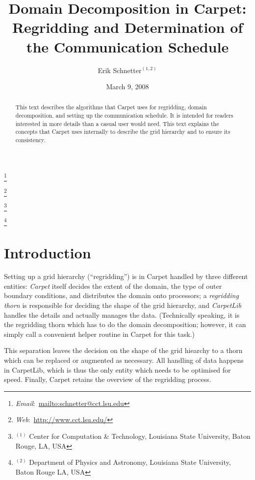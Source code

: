 \documentclass[oneside]{amsart}
\begin{document}
\title[Domain Decomposition in Carpet]{Domain Decomposition in
  Carpet:\\Regridding and Determination of the Communication Schedule}

\author{Erik Schnetter$^{(1,2)}$}

\thanks{\emph{Email}:~\url{mailto:schnetter@cct.lsu.edu}}

\thanks{\emph{Web}:~\url{http://www.cct.lsu.edu/}}

\thanks{{}$^{(1)}$ Center for Computation \& Technology,
  Louisiana State University, Baton Rouge, LA, USA}

\thanks{{}$^{(2)}$ Department of Physics and Astronomy,
  Louisiana State University, Baton Rouge LA, USA}



\date{March 9, 2008}



\begin{abstract}
  This text describes the algorithms that Carpet
  \cite{Schnetter-etal-03b, carpetweb} uses for regridding, domain
  decomposition, and setting up the communication schedule.  It is
  intended for readers interested in more details than a casual user
  would need.  This text explains the concepts that Carpet uses
  internally to describe the grid hierarchy and to ensure its
  consistency.
\end{abstract}

\maketitle



\section{Introduction}

Setting up a grid hierarchy (``regridding'') is in Carpet handled by
three different entities: \emph{Carpet} itself decides the extent of
the domain, the type of outer boundary conditions, and distributes the
domain onto processors; a \emph{regridding thorn} is responsible for
deciding the shape of the grid hierarchy, and \emph{CarpetLib} handles
the details and actually manages the data.  (Technically speaking, it
is the regridding thorn which has to do the domain decomposition;
however, it can simply call a convenient helper routine in Carpet for
this task.)

This separation leaves the decision on the shape of the grid hiearchy
to a thorn which can be replaced or augmented as necessary.  All
handling of data happens in CarpetLib, which is thus the only entity
which needs to be optimised for speed.  Finally, Carpet retains the
overview of the regridding process.
\end{document}
